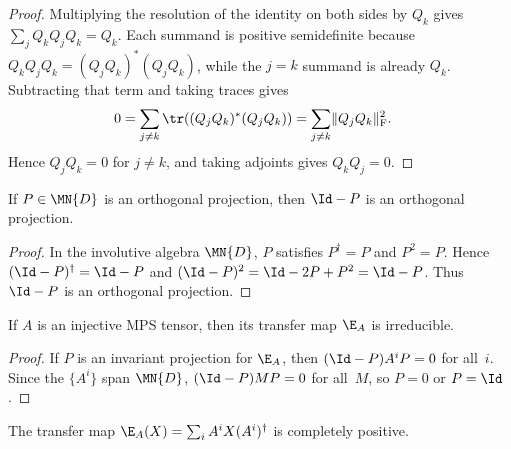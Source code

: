\begin{proof}\leanok
    Multiplying the resolution of the identity on both sides by $Q_k$ gives
    $\sum_j Q_kQ_jQ_k=Q_k$. Each summand is positive semidefinite because
    $Q_kQ_jQ_k=(Q_jQ_k)^*(Q_jQ_k)$, while the $j=k$ summand is already $Q_k$.
    Subtracting that term and taking traces gives
    \begin{align}
        0
         & =\sum_{j\ne k}\tr((Q_jQ_k)^*(Q_jQ_k))
        =\sum_{j\ne k}\lVert Q_jQ_k\rVert_{\mathrm F}^{2}.
        \notag
    \end{align}
    Hence $Q_jQ_k=0$ for $j\ne k$, and taking adjoints gives $Q_kQ_j=0$.
\end{proof}

\begin{theorem}
    \label{thm:orthogonal_projection_complement_channel}
    \leanok
    If $P \in \MN{D}$ is an orthogonal projection, then $\Id-P$ is an
    orthogonal projection.
\end{theorem}

\begin{proof}\leanok
    In the involutive algebra $\MN{D}$, $P$ satisfies $P^\dagger=P$ and
    $P^2=P$. Hence $(\Id-P)^\dagger=\Id-P$ and
    $(\Id-P)^2=\Id-2P+P^2=\Id-P$. Thus $\Id-P$ is an orthogonal projection.
\end{proof}

\begin{theorem}\label{thm:injective_irreducible}
    \leanok
    If $A$ is an injective MPS tensor, then its transfer map $\E_A$
    is irreducible.
\end{theorem}

\begin{proof}
    \leanok
    If $P$ is an invariant projection for $\E_A$, then
    $(\Id-P)A^iP=0$ for all~$i$. Since the $\{A^i\}$ span $\MN{D}$,
    $(\Id-P)MP=0$ for all~$M$, so $P=0$ or $P=\Id$.
\end{proof}

\begin{theorem}\label{thm:transfer_cp}
    \leanok
    The transfer map $\E_A(X)=\sum_i A^iX(A^i)^\dagger$
    is completely positive.
\end{theorem}


